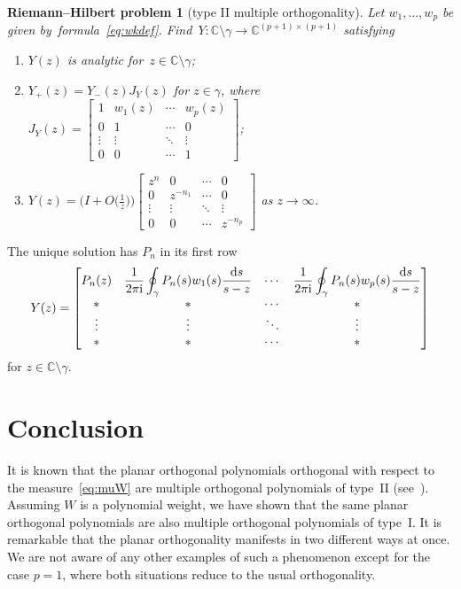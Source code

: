 \documentclass[pdftex]{sigma}
\numberwithin{equation}{section}
\newtheorem*{rhproblem}{Riemann--Hilbert problem}
{ \theoremstyle{definition}
 \newtheorem{Definition}[Theorem]{Definition}
 \newtheorem{Note}[Theorem]{Note}
 \newtheorem{Example}[Theorem]{Example}
 \newtheorem{Remark}[Theorem]{Remark}
}
\newcommand*{\Cset}{\mathbb{C}} %
\begin{document}
 \begin{rhproblem}[type II multiple orthogonality]
 Let $w_1, \dots, w_p$ be given by~formula~\eqref{eq:wkdef}. Find~$Y \colon \Cset \setminus \gamma \to \Cset^{(p+1) \times (p+1)}$ satisfying
 \begin{enumerate}
 \item[$(1)$] $Y(z)$ is analytic for~$z \in \Cset \setminus \gamma$;

 \item[$(2)$] $Y_+(z) = Y_-(z) J_Y(z)$ for $z \in \gamma$, where
$
 J_Y(z) =
 \begin{bmatrix}
 1 & w_1(z)&\cdots& w_{p}(z)\\
 0 & 1& \cdots & 0\\
 \vdots & \vdots&\ddots&\vdots\\
 0&0&\cdots& 1
 \end{bmatrix}
$;

 \item[$(3)$] $Y(z) = \big(I+O\big(\frac{1}{z}\big)\big)
 \begin{bmatrix}
 z^n&0&\cdots&0\\
 0&z^{-n_1}&\cdots& 0\\
 \vdots&\vdots& \ddots&\vdots\\
 0&0&\cdots&z^{-n_p}
 \end{bmatrix}
 $ as $z \to \infty$.
 \end{enumerate}
 \end{rhproblem}

 The unique solution has $P_n$ in its first row
 \begin{equation} \label{eq:YtypeII}
 Y(z)=
 \begin{bmatrix}
 P_n(z) & \displaystyle \frac{1}{2 \pi {\rm i}} \oint_\gamma P_n(s) w_{1}(s) \frac{{\rm d}s}{s-z} &\cdots & \displaystyle \frac{1}{2 \pi {\rm i}} \oint_\gamma P_n(s) w_{p}(s) \frac{{\rm d}s}{s-z}\\
 * & *&\cdots&*\\
 \vdots & \vdots& \ddots& \vdots\\
 * & *&\cdots&*
 \end{bmatrix}
 \end{equation}
 for $z \in \Cset \setminus \gamma$.

 \section{Conclusion}
 \label{sec:conc}
 It is known that the planar orthogonal polynomials orthogonal with respect to the measure~\eqref{eq:muW} are multiple orthogonal polynomials of type~II (see~\cite{LY2}). Assuming $W$ is a polynomial weight, we have shown that the same planar orthogonal polynomials are also multiple orthogonal polynomials of type~I. It is remarkable that the planar orthogonality manifests in two different ways at once. We are not aware of any other examples of such a phenomenon except for the case $p=1$, where both situations reduce to the usual orthogonality.
\end{document}
